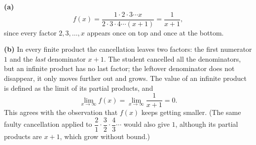 \textbf{(a)}
\[f(x)=\dfrac{1\cdot2\cdot3\cdots x}{2\cdot3\cdot4\cdots(x+1)}=\boxed{\dfrac{1}{x+1}},\]
since every factor $2,3,\dots,x$ appears once on top and once at the bottom.

\textbf{(b)} In every finite product the cancellation leaves two factors: the first numerator $1$ and the \emph{last} denominator $x+1$. The student cancelled all the denominators, but an infinite product has no last factor; the leftover denominator does not disappear, it only moves further out and grows. The value of an infinite product is defined as the limit of its partial products, and
\[\lim_{x\to\infty}f(x)=\lim_{x\to\infty}\dfrac{1}{x+1}=\boxed{0}.\]
This agrees with the observation that $f(x)$ keeps getting smaller. (The same faulty cancellation applied to $\dfrac21\cdot\dfrac32\cdot\dfrac43\cdots$ would also give $1$, although its partial products are $x+1$, which grow without bound.)
